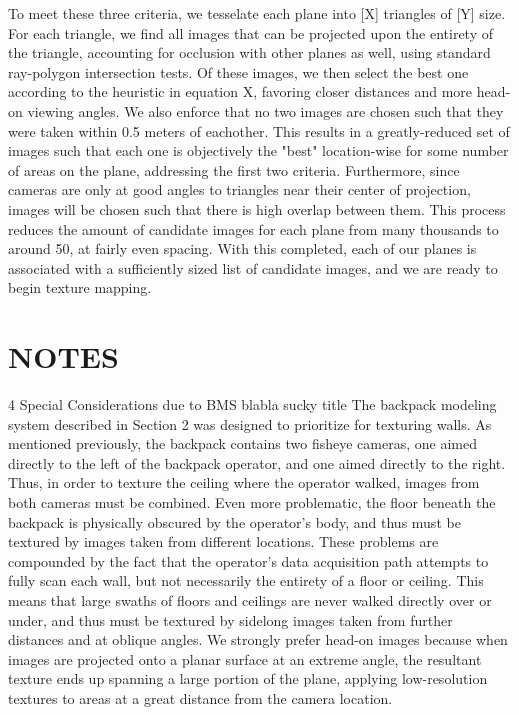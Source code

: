 \documentclass[10pt,twocolumn,letterpaper]{article}
\begin{document}
To meet these three criteria, we tesselate each plane into [X] triangles of [Y] size. For each triangle, we find all images that can be projected upon the entirety of the triangle, accounting for occlusion with other planes as well, using standard ray-polygon intersection tests. Of these images, we then select the best one according to the heuristic in equation X, favoring closer distances and more head-on viewing angles. We also enforce that no two images are chosen such that they were taken within 0.5 meters of eachother. This results in a greatly-reduced set of images such that each one is objectively the "best" location-wise for some number of areas on the plane, addressing the first two criteria. Furthermore, since cameras are only at good angles to triangles near their center of projection, images will be chosen such that there is high overlap between them. This process reduces the amount of candidate images for each plane from many thousands to around 50, at fairly even spacing. With this completed, each of our planes is associated with a sufficiently sized list of candidate images, and we are ready to begin texture mapping.


\section{NOTES}
4 Special Considerations due to BMS blabla sucky title
The backpack modeling system described in Section 2 was designed to prioritize for texturing walls. As mentioned previously, the backpack contains two fisheye cameras, one aimed directly to the left of the backpack operator, and one aimed directly to the right. Thus, in order to texture the ceiling where the operator walked, images from both cameras must be combined. Even more problematic, the floor beneath the backpack is physically obscured by the operator's body, and thus must be textured by images taken from different locations. These problems are compounded by the fact that the operator's data acquisition path attempts to fully scan each wall, but not necessarily the entirety of a floor or ceiling. This means that large swaths of floors and ceilings are never walked directly over or under, and thus must be textured by sidelong images taken from further distances and at oblique angles. We strongly prefer head-on images because when images are projected onto a planar surface at an extreme angle, the resultant texture ends up spanning a large portion of the plane, applying low-resolution textures to areas at a great distance from the camera location.
\end{document}
